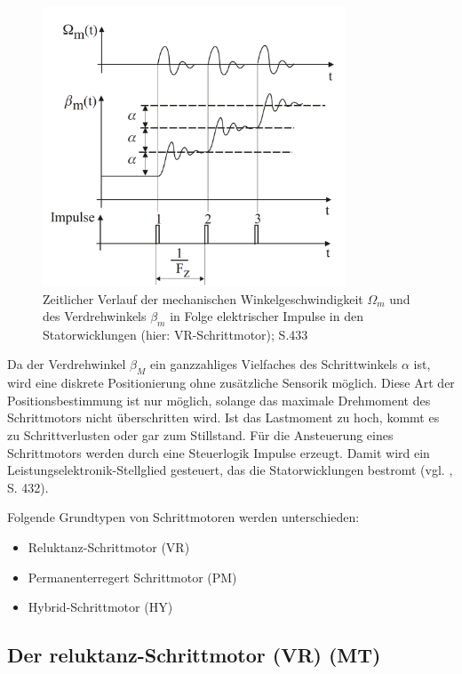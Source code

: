  
\begin{figure}[h]
	\begin{center}
		\includegraphics[width=9cm]{DiagrammVerlaufSchrittmotor.png}
		\caption{Zeitlicher Verlauf der mechanischen Winkelgeschwindigkeit $\Omega_m$ und des Verdrehwinkels $\beta_m$ in Folge elektrischer Impulse in den Statorwicklungen (hier: VR-Schrittmotor); \cite{kleinantriebe} S.433}
		\label{pic:diagrammSchrittmotor}
	\end{center}
\end{figure}



Da der Verdrehwinkel $\beta_M$ ein ganzzahliges Vielfaches des Schrittwinkels $\alpha$ ist, wird eine diskrete Positionierung ohne zusätzliche Sensorik möglich. Diese Art der Positionsbestimmung ist nur möglich, solange das maximale Drehmoment des Schrittmotors nicht überschritten wird. Ist das Lastmoment zu hoch, kommt es zu Schrittverlusten oder gar zum Stillstand.   Für die Ansteuerung eines Schrittmotors werden durch eine Steuerlogik Impulse erzeugt. Damit wird ein Leistungselektronik-Stellglied gesteuert, das die Statorwicklungen bestromt (vgl. \cite{kleinantriebe}, S. 432). \newline

Folgende Grundtypen von Schrittmotoren werden unterschieden: 
\begin{itemize}
	\item Reluktanz-Schrittmotor (VR)
	\item Permanenterregert Schrittmotor (PM)
	\item Hybrid-Schrittmotor (HY)
\end{itemize}

\newpage

\subsection{Der \acrshort{reluktanz}-Schrittmotor (VR) (MT)}

